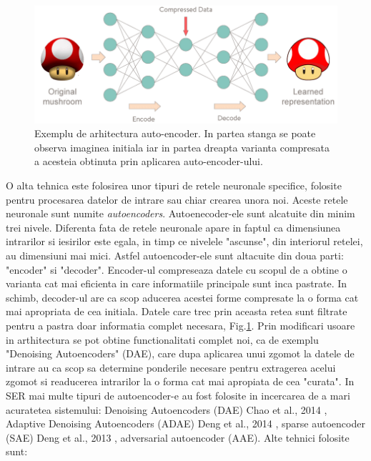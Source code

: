 \documentclass[a4paper,12pt]{book}
\begin{document}
						\begin{figure}[h]
							\centering
							\includegraphics[scale=0.4]{mushroom_encoder}
							\caption{Exemplu de arhitectura auto-encoder. In partea stanga se poate observa imaginea initiala iar in partea dreapta varianta compresata a acesteia obtinuta prin aplicarea auto-encoder-ului.}
							\label{fig:ae}							
						\end{figure}
						O alta tehnica este folosirea unor tipuri de retele neuronale specifice, folosite pentru procesarea datelor de intrare sau chiar crearea unora noi. Aceste retele neuronale sunt numite \textit{autoencoders}. Autoenecoder-ele sunt alcatuite din minim trei nivele. Diferenta fata de retele neuronale apare in faptul ca dimensiunea intrarilor si iesirilor este egala, in timp ce nivelele "ascunse", din interiorul retelei, au dimensiuni mai mici. Astfel autoencoder-ele sunt altacuite din doua parti: "encoder" si "decoder". Encoder-ul compreseaza datele cu scopul de a obtine o varianta cat mai eficienta in care informatiile principale sunt inca pastrate. In schimb, decoder-ul are ca scop aducerea acestei forme compresate la o forma cat mai apropriata de cea initiala. Datele care trec prin aceasta retea sunt filtrate pentru a pastra doar informatia complet necesara, Fig.\ref{fig:ae}. Prin modificari usoare in arthitectura se pot obtine functionalitati complet noi, ca de exemplu "Denoising Autoencoders" (DAE), care dupa aplicarea unui zgomot la datele de intrare au ca scop sa determine ponderile necesare pentru extragerea acelui zgomot si readucerea intrarilor la o forma cat mai apropiata de cea "curata". In SER mai multe tipuri de autoencoder-e au fost folosite in incercarea de a mari acuratetea sistemului: Denoising Autoencoders (DAE) Chao et al., 2014 \cite{dae}, Adaptive Denoising Autoencoders (ADAE) Deng et al., 2014 \cite{adae}, sparse autoencoder (SAE) Deng et al., 2013 \cite{sdae}, adversarial autoencoder (AAE).
						Alte tehnici folosite sunt: 
\end{document}
